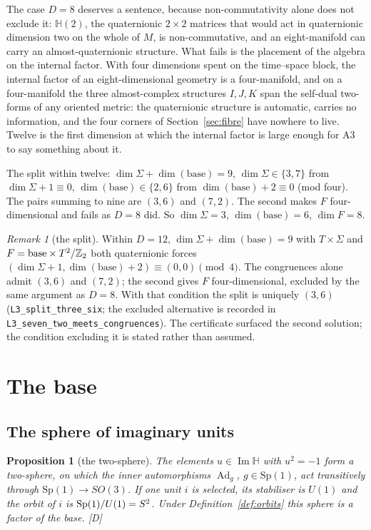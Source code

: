 \documentclass[11pt,a4paper]{article}
\theoremstyle{plain}
\newtheorem{proposition}[theorem]{Proposition}
\theoremstyle{definition}
\theoremstyle{remark}
\newtheorem{remark}[theorem]{Remark}
\newcommand{\Hquat}{\mathbb{H}}
\newcommand{\ImH}{\operatorname{Im}\Hquat}
\newcommand{\Ad}{\operatorname{Ad}}
\newcommand{\rigD}{[\textup{D}]}
\begin{document}
The case $D=8$ deserves a sentence, because non-commutativity alone does not exclude it: $\Hquat(2)$, the quaternionic $2\times2$ matrices that would act in quaternionic dimension two on the whole of $M$, is non-commutative, and an eight-manifold can carry an almost-quaternionic structure. What fails is the placement of the algebra on the internal factor. With four dimensions spent on the time--space block, the internal factor of an eight-dimensional geometry is a four-manifold, and on a four-manifold the three almost-complex structures $I,J,K$ span the self-dual two-forms of any oriented metric: the quaternionic structure is automatic, carries no information, and the four corners of Section~\ref{sec:fibre} have nowhere to live. Twelve is the first dimension at which the internal factor is large enough for A3 to say something about it.

The split within twelve: $\dim\Sigma+\dim(\text{base})=9$, $\dim\Sigma\in\{3,7\}$ from $\dim\Sigma+1\equiv0$, $\dim(\text{base})\in\{2,6\}$ from $\dim(\text{base})+2\equiv0$ (mod four). The pairs summing to nine are $(3,6)$ and $(7,2)$. The second makes $F$ four-dimensional and fails as $D=8$ did. So $\dim\Sigma=3$, $\dim(\text{base})=6$, $\dim F=8$.

\begin{remark}[the split]\label{rem:split}
Within $D=12$, $\dim\Sigma+\dim(\text{base})=9$ with $T\times\Sigma$ and $F=\text{base}\times T^2/\mathbb{Z}_2$ both quaternionic forces $(\dim\Sigma+1,\dim(\text{base})+2)\equiv(0,0)\pmod 4$. The congruences alone admit $(3,6)$ and $(7,2)$; the second gives $F$ four-dimensional, excluded by the same argument as $D=8$. With that condition the split is uniquely $(3,6)$ (\texttt{L3\_split\_three\_six}; the excluded alternative is recorded in \texttt{L3\_seven\_two\_meets\_congruences}). The certificate surfaced the second solution; the condition excluding it is stated rather than assumed.
\end{remark}

\section{The base}\label{sec:base}

\subsection{The sphere of imaginary units}

\begin{proposition}[the two-sphere]\label{prop:S2}
The elements $u\in\ImH$ with $u^{2}=-1$ form a two-sphere, on which the inner automorphisms $\Ad_{g}$, $g\in\mathrm{Sp}(1)$, act transitively through $\mathrm{Sp}(1)\to SO(3)$. 
If one unit $i$ is selected, its stabiliser is $U(1)$ and the orbit of $i$ is $\mathrm{Sp}(1)/U(1)=S^2$.
 Under Definition~\ref{def:orbits} this sphere is a factor of the base. \rigD
\end{proposition}
\end{document}
